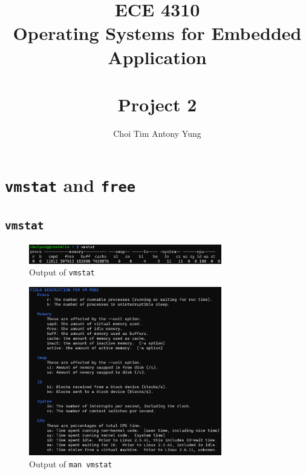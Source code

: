 \documentclass{article}
\title{ECE 4310\\Operating Systems for Embedded Application\\\,\\Project 2}
\author{Choi Tim Antony Yung}
\begin{document}
\maketitle

\thispagestyle{empty}
\setcounter{page}{0}

\newpage

\section{\texttt{vmstat} and \texttt{free}}

\subsection{\texttt{vmstat}}

\begin{figure}[H]

  \caption{Output of \texttt{vmstat}}
  \centering
  \includegraphics[width=0.75\textwidth]{ECE4310_proj2_vmstat.png}
\end{figure}

\begin{figure}[H]
  \caption{Output of \texttt{man vmstat}}
  \centering
  \includegraphics[width=0.75\textwidth]{ECE4310_proj2_vmstat_man.png}
\end{figure}
\end{document}
